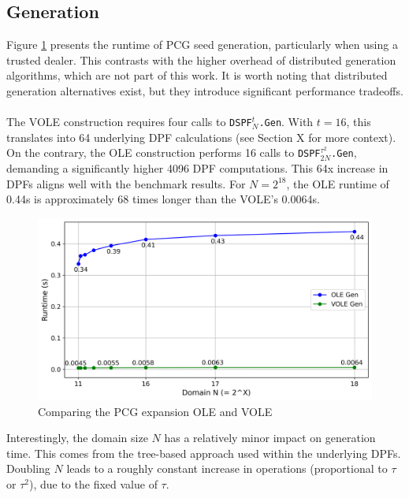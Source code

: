 \subsection{Generation}
\label{subsec:evalGen}
Figure \ref{fig:ComparingPCGGeneration} presents the runtime of PCG seed generation, particularly when using a trusted dealer. This contrasts with the higher overhead of distributed generation algorithms, which are not part of this work. It is worth noting that distributed generation alternatives exist, but they introduce significant performance tradeoffs.
\\\\
The VOLE construction requires four calls to \texttt{DSPF$^{t}_{N}$.Gen}. With $t=16$, this translates into 64 underlying DPF calculations (see Section \todo X for more context). On the contrary, the OLE construction performs 16 calls to \texttt{DSPF$^{\tau^2}_{2N}$.Gen}, demanding a significantly higher 4096 DPF computations. This 64x increase in DPFs aligns well with the benchmark results. For $N=2^{18}$, the OLE runtime of 0.44s is approximately 68 times longer than the VOLE's 0.0064s. 

\begin{figure}[t]
    \centering
    \includegraphics[scale=0.49]{images/plots/pcg_gen.png}
    \caption{Comparing the PCG expansion OLE and VOLE}
    \label{fig:ComparingPCGGeneration}
\end{figure}

Interestingly, the domain size $N$ has a relatively minor impact on generation time. This comes from the tree-based approach used within the underlying DPFs. Doubling $N$ leads to a roughly constant increase in operations (proportional to $\tau$ or $\tau^2$), due to the fixed value of $\tau$. 

